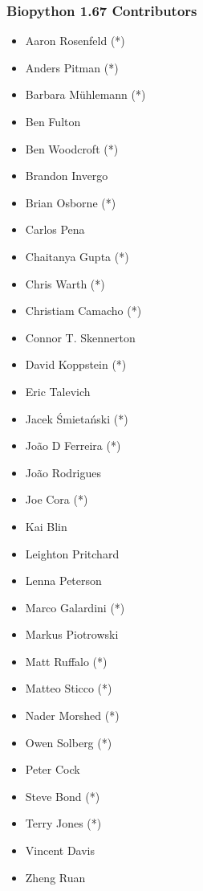 \documentclass[trans]{beamer}
\begin{document}
{
  \frametitle{Biopython 1.67 Contributors}

  \scriptsize{
  \begin{multicols}{2}
  \begin{itemize}
  \item Aaron Rosenfeld (*)
  \item Anders Pitman (*)
  \item Barbara Mühlemann (*)
  \item Ben Fulton
  \item Ben Woodcroft (*)
  \item Brandon Invergo
  \item Brian Osborne (*)
  \item Carlos Pena
  \item Chaitanya Gupta (*)
  \item Chris Warth (*)
  \item Christiam Camacho (*)
  \item Connor T. Skennerton
  \item David Koppstein (*)
  \item Eric Talevich
  \item Jacek Śmietański (*)
  \item João D Ferreira (*)
  \item João Rodrigues
  \item Joe Cora (*)
  \item Kai Blin
  \item Leighton Pritchard
  \item Lenna Peterson
  \item Marco Galardini (*)
  \item Markus Piotrowski
  \item Matt Ruffalo (*)
  \item Matteo Sticco (*)
  \item Nader Morshed (*)
  \item Owen Solberg (*)
  \item Peter Cock
  \item Steve Bond (*)
  \item Terry Jones (*)
  \item Vincent Davis
  \item Zheng Ruan
  \end{itemize}
  \end{multicols}
  }
}
\end{document}
